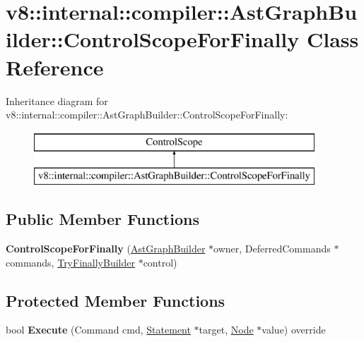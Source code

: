 \hypertarget{classv8_1_1internal_1_1compiler_1_1_ast_graph_builder_1_1_control_scope_for_finally}{}\section{v8\+:\+:internal\+:\+:compiler\+:\+:Ast\+Graph\+Builder\+:\+:Control\+Scope\+For\+Finally Class Reference}
\label{classv8_1_1internal_1_1compiler_1_1_ast_graph_builder_1_1_control_scope_for_finally}
Inheritance diagram for v8\+:\+:internal\+:\+:compiler\+:\+:Ast\+Graph\+Builder\+:\+:Control\+Scope\+For\+Finally\+:\begin{figure}[H]
\begin{center}
\leavevmode
\includegraphics[height=2.000000cm]{classv8_1_1internal_1_1compiler_1_1_ast_graph_builder_1_1_control_scope_for_finally}
\end{center}
\end{figure}
\subsection*{Public Member Functions}
\begin{DoxyCompactItemize}
\item 
{\bfseries Control\+Scope\+For\+Finally} (\hyperlink{classv8_1_1internal_1_1compiler_1_1_ast_graph_builder}{Ast\+Graph\+Builder} $\ast$owner, Deferred\+Commands $\ast$commands, \hyperlink{classv8_1_1internal_1_1compiler_1_1_try_finally_builder}{Try\+Finally\+Builder} $\ast$control)\hypertarget{classv8_1_1internal_1_1compiler_1_1_ast_graph_builder_1_1_control_scope_for_finally_a6dd184aee14636ff74ebd78665124285}{}\label{classv8_1_1internal_1_1compiler_1_1_ast_graph_builder_1_1_control_scope_for_finally_a6dd184aee14636ff74ebd78665124285}

\end{DoxyCompactItemize}
\subsection*{Protected Member Functions}
\begin{DoxyCompactItemize}
\item 
bool {\bfseries Execute} (Command cmd, \hyperlink{classv8_1_1internal_1_1_statement}{Statement} $\ast$target, \hyperlink{classv8_1_1internal_1_1compiler_1_1_node}{Node} $\ast$value) override\hypertarget{classv8_1_1internal_1_1compiler_1_1_ast_graph_builder_1_1_control_scope_for_finally_aae994374918912a0f58de32c72bf7646}{}\label{classv8_1_1internal_1_1compiler_1_1_ast_graph_builder_1_1_control_scope_for_finally_aae994374918912a0f58de32c72bf7646}

\end{DoxyCompactItemize}
